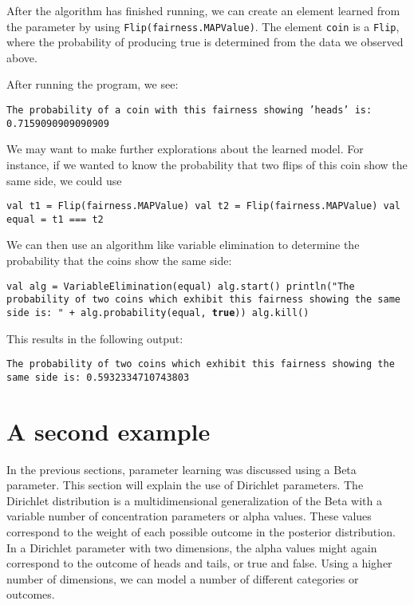 After the algorithm has finished running, we can create an element learned from the parameter by using \texttt{Flip(fairness.MAPValue)}. The element \texttt{coin} is a \texttt{Flip}, where the probability of producing true is determined from the data we observed above.

After running the program, we see:

\begin{flushleft}
\texttt{The probability of a coin with this fairness showing 'heads' is:
0.7159090909090909}
\end{flushleft}

We may want to make further explorations about the learned model. For instance, if we wanted to know the probability that two flips of this coin show the same side, we could use

\begin{flushleft}
\texttt{val t1 = Flip(fairness.MAPValue) 
\newline val t2 = Flip(fairness.MAPValue) 
\newline val equal = t1 === t2}
\end{flushleft}

We can then use an algorithm like variable elimination to determine the probability that the coins show the same side:

\begin{flushleft}
\texttt{val alg = VariableElimination(equal)
\newline alg.start()
\newline println("The probability of two coins which exhibit this fairness showing the same side is: " + alg.probability(equal, \textbf{true}))
\newline alg.kill()
}
\end{flushleft}

This results in the following output:

\begin{flushleft}
\texttt{The probability of two coins which exhibit this fairness showing the same side is: 0.5932334710743803}
\end{flushleft}

\section{A second example}

In the previous sections, parameter learning was discussed using a Beta parameter. This section will explain the use of Dirichlet parameters. The Dirichlet distribution is a multidimensional generalization of the Beta with a variable number of concentration parameters or alpha values. These values correspond to the weight of each possible outcome in the posterior distribution. In a Dirichlet parameter with two dimensions, the alpha values might again correspond to the outcome of heads and tails, or true and false. Using a higher number of dimensions, we can model a number of different categories or outcomes.

